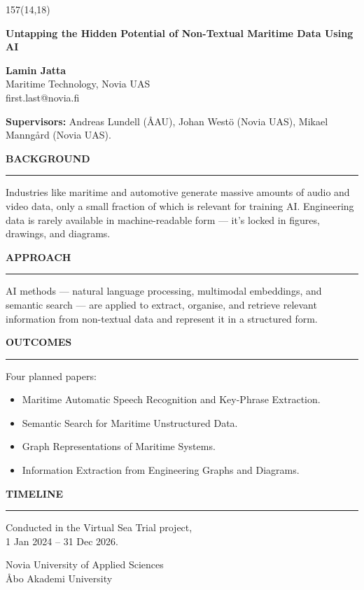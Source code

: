 \documentclass{article}
\newcommand{\panelhead}[1]{%
  \par\addvspace{6mm}%
  {\headingfont\bfseries\fontsize{15pt}{18pt}\selectfont
   \MakeUppercase{#1}\par}%
  \nopagebreak\vspace{1mm}%
  \textcolor{accent}{\rule{32mm}{1.5pt}}\par
  \vspace{2mm}%
}
\begin{document}
\begin{textblock}{157}(14,18)                   %
  \color{paneltext}\fontsize{12pt}{16pt}\selectfont\RaggedRight

  {\headingfont\bfseries\fontsize{20pt}{24pt}\selectfont
   Untapping the Hidden Potential of Non-Textual Maritime Data Using AI\par}
  \vspace{6mm}

  {\fontsize{10pt}{13pt}\selectfont
   \textbf{Lamin Jatta}\\
   Maritime Technology, Novia UAS\\
   first.last@novia.fi\par
   \vspace{2mm}
   \textbf{Supervisors:} Andreas Lundell (ÅAU),
   Johan Westö (Novia UAS), Mikael Manngård (Novia UAS).\par}

  \panelhead{Background}
  Industries like maritime and automotive generate massive amounts of
  audio and video data, only a small fraction of which is relevant for
  training AI. Engineering data is rarely available in machine-readable
  form — it's locked in figures, drawings, and diagrams.

  \panelhead{Approach}
  AI methods — natural language processing, multimodal embeddings, and
  semantic search — are applied to extract, organise, and retrieve
  relevant information from non-textual data and represent it in a
  structured form.

  \panelhead{Outcomes}
  Four planned papers:
  \begin{itemize}\setlength{\itemsep}{1pt}\setlength{\parsep}{1pt}
    \item[I.] Maritime Automatic Speech Recognition and Key-Phrase Extraction.
    \item[II.] Semantic Search for Maritime Unstructured Data.
    \item[III.] Graph Representations of Maritime Systems.
    \item[IV.] Information Extraction from Engineering Graphs and Diagrams.
  \end{itemize}

  \panelhead{Timeline}
  Conducted in the Virtual Sea Trial project,\\
  1 Jan 2024 -- 31 Dec 2026.

  \vfill
  {\color{panelmuted}\fontsize{9pt}{12pt}\selectfont
   Novia University of Applied Sciences \\ Åbo Akademi University\par}
\end{textblock}
\end{document}
